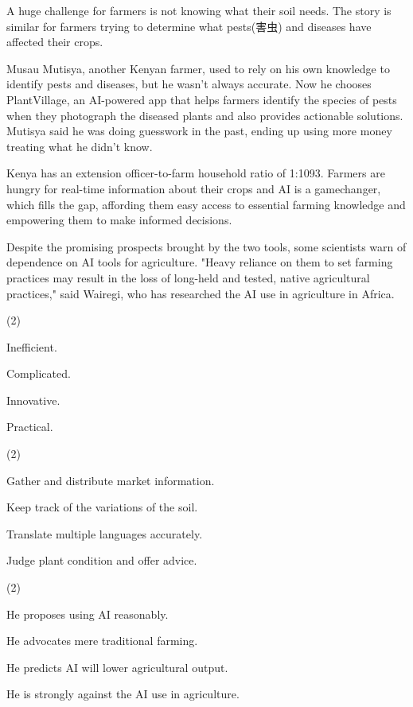 \documentclass{英语试卷}
\begin{document}
\par A huge challenge for farmers is not knowing what their soil needs. The story is similar for farmers trying to determine what pests(害虫) and diseases have affected their crops.\par
\par Musau Mutisya, another Kenyan farmer, used to rely on his own knowledge to identify pests and diseases, but he wasn't always accurate. Now he chooses PlantVillage, an AI-powered app that helps farmers identify the species of pests when they photograph the diseased plants and also provides actionable solutions. Mutisya said he was doing guesswork in the past, ending up using more money treating what he didn't know.\par
\par Kenya has an extension officer-to-farm household ratio of 1:1093. Farmers are hungry for real-time information about their crops and AI is a gamechanger, which fills the gap, affording them easy access to essential farming knowledge and empowering them to make informed decisions.\par
\par Despite the promising prospects brought by the two tools, some scientists warn of dependence on AI tools for agriculture. "Heavy reliance on them to set farming practices may result in the loss of long-held and tested, native agricultural practices," said Wairegi, who has researched the AI use in agriculture in Africa.\par
{}
\begin{choices}(2)
  \item Inefficient.
  \item Complicated.
  \item Innovative.
  \item Practical.
\end{choices}
\begin{choices}(2)
  \item Gather and distribute market information.
  \item Keep track of the variations of the soil.
  \item Translate multiple languages accurately.
  \item Judge plant condition and offer advice.
\end{choices}
\begin{choices}(2)
  \item He proposes using AI reasonably.
  \item He advocates mere traditional farming.
  \item He predicts AI will lower agricultural output.
  \item He is strongly against the AI use in agriculture.
\end{choices}
\end{document}
